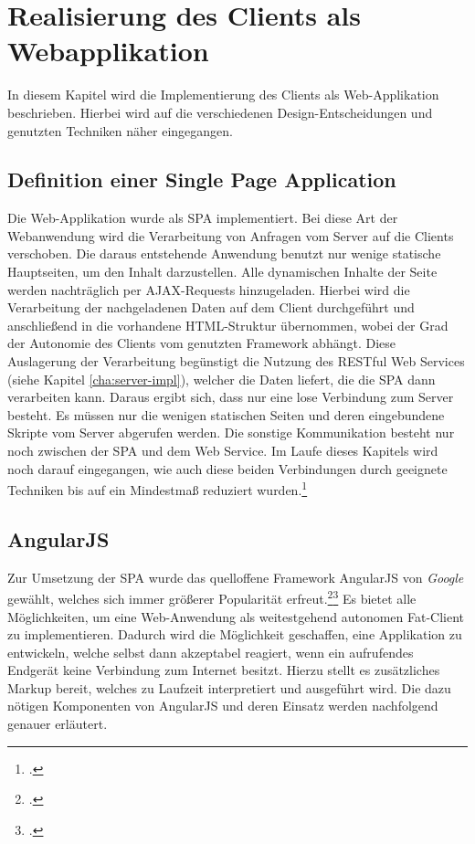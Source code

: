 \chapter{Realisierung des Clients als Webapplikation}
\label{cha:web-app}
In diesem Kapitel wird die Implementierung des Clients als Web-Applikation beschrieben. Hierbei wird auf die verschiedenen Design-Entscheidungen und genutzten Techniken näher eingegangen. 
\section{Definition einer Single Page Application}
\label{sec:Definition-SPA}
Die Web-Applikation wurde als \ac{SPA} implementiert. Bei diese Art der Webanwendung wird die Verarbeitung von Anfragen vom Server auf die Clients verschoben. Die daraus entstehende Anwendung benutzt nur wenige statische Hauptseiten, um den Inhalt darzustellen. Alle dynamischen Inhalte der Seite werden nachträglich per \ac{AJAX}-Requests hinzugeladen.  Hierbei wird die Verarbeitung der nachgeladenen Daten auf dem Client durchgeführt und anschließend in die vorhandene \ac{HTML}-Struktur übernommen, wobei der Grad der Autonomie des Clients vom genutzten Framework abhängt. Diese Auslagerung der Verarbeitung begünstigt die Nutzung des \ac{REST}ful Web Services (siehe Kapitel \ref{cha:server-impl}), welcher die Daten liefert, die die \ac{SPA} dann verarbeiten kann. Daraus ergibt sich, dass nur eine lose Verbindung zum Server besteht. Es müssen nur  die wenigen statischen Seiten und deren eingebundene Skripte vom Server abgerufen werden. Die sonstige Kommunikation besteht nur noch zwischen der SPA und dem Web Service. Im Laufe dieses Kapitels wird noch darauf eingegangen, wie auch diese beiden Verbindungen durch geeignete Techniken bis auf ein Mindestmaß reduziert wurden.\footcite[S. 31f.]{book:AngularJs:Steyer2015}
\section{AngularJS}
\label{sec:AngularJS}
Zur Umsetzung der \ac{SPA} wurde das quelloffene Framework AngularJS von \textit{Google} gewählt, welches sich immer größerer Popularität erfreut.\footcite{online:angularjs-popularity}\footcite[S. 33]{book:AngularJs:Steyer2015} Es bietet alle Möglichkeiten, um eine Web-Anwendung als weitestgehend autonomen \gls{Fat-Client} zu implementieren. Dadurch wird die Möglichkeit geschaffen, eine Applikation zu entwickeln, welche selbst dann akzeptabel reagiert, wenn ein aufrufendes Endgerät keine Verbindung zum Internet besitzt. Hierzu stellt es zusätzliches Markup bereit, welches zu Laufzeit interpretiert und ausgeführt wird. Die dazu nötigen Komponenten von AngularJS und deren Einsatz werden nachfolgend genauer erläutert.


